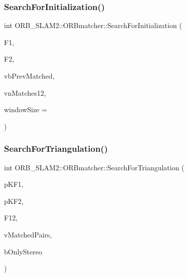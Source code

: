 \mbox{\label{class_o_r_b___s_l_a_m2_1_1_o_r_bmatcher_aff9b6dde7878d59e334ed5ad2ddd04eb}} 
\subsubsection{\texorpdfstring{Search\+For\+Initialization()}{SearchForInitialization()}}
{\footnotesize\ttfamily int O\+R\+B\+\_\+\+S\+L\+A\+M2\+::\+O\+R\+Bmatcher\+::\+Search\+For\+Initialization (\begin{DoxyParamCaption}\item[{\mbox{\hyperlink{class_o_r_b___s_l_a_m2_1_1_frame}{Frame}} \&}]{F1,  }\item[{\mbox{\hyperlink{class_o_r_b___s_l_a_m2_1_1_frame}{Frame}} \&}]{F2,  }\item[{std\+::vector$<$ cv\+::\+Point2f $>$ \&}]{vb\+Prev\+Matched,  }\item[{std\+::vector$<$ int $>$ \&}]{vn\+Matches12,  }\item[{int}]{window\+Size = {} }\end{DoxyParamCaption})}

\mbox{\label{class_o_r_b___s_l_a_m2_1_1_o_r_bmatcher_a0ecb7f018e9184c67c4a48ad8616217d}} 
\subsubsection{\texorpdfstring{Search\+For\+Triangulation()}{SearchForTriangulation()}}
{\footnotesize\ttfamily int O\+R\+B\+\_\+\+S\+L\+A\+M2\+::\+O\+R\+Bmatcher\+::\+Search\+For\+Triangulation (\begin{DoxyParamCaption}\item[{\mbox{\hyperlink{class_o_r_b___s_l_a_m2_1_1_key_frame}{Key\+Frame}} $\ast$}]{p\+K\+F1,  }\item[{\mbox{\hyperlink{class_o_r_b___s_l_a_m2_1_1_key_frame}{Key\+Frame}} $\ast$}]{p\+K\+F2,  }\item[{cv\+::\+Mat}]{F12,  }\item[{std\+::vector$<$ pair$<$ size\+\_\+t, size\+\_\+t $>$ $>$ \&}]{v\+Matched\+Pairs,  }\item[{const bool}]{b\+Only\+Stereo }\end{DoxyParamCaption})}



